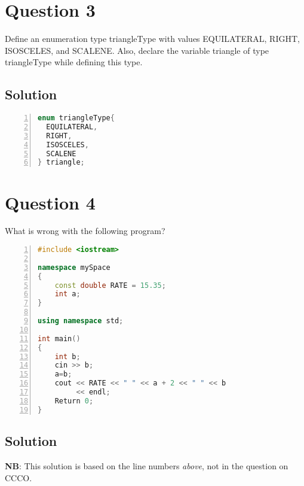 \documentclass[a4paper, 10pt]{article}
\begin{document}
  \newpage
  \section{Question 3}
    Define an enumeration type triangleType with values EQUILATERAL, RIGHT, ISOSCELES, and SCALENE.
        Also, declare the variable triangle of type triangleType while defining this type.
    \subsection{Solution}
      \begin{lstlisting}[language=c++,caption=Question 3 Solution,numbers=left]
enum triangleType{
  EQUILATERAL,
  RIGHT,
  ISOSCELES,
  SCALENE
} triangle;
      \end{lstlisting}

  \section{Question 4}
    What is wrong with the following program?
    \begin{lstlisting}[language=c++,numbers=left]
#include <iostream>

namespace mySpace
{
    const double RATE = 15.35;
    int a;
}

using namespace std;

int main()
{
    int b;
    cin >> b;
    a=b;
    cout << RATE << " " << a + 2 << " " << b
         << endl;
    Return 0;
}
    \end{lstlisting}
    \subsection{Solution}
      \begin{center}
          \textbf{NB}: This solution is based on the line numbers \textit{above}, not in the question on CCCO.
      \end{center}
      
\end{document}
